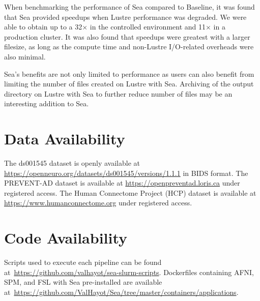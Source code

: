 \documentclass[pdflatex,sn-mathphys-num]{sn-jnl}
\theoremstyle{thmstyleone}%
\theoremstyle{thmstyletwo}%
\theoremstyle{thmstylethree}%
\begin{document}
    When benchmarking the performance of Sea compared to Baseline, it was found that Sea provided speedups
    when Lustre performance was degraded. We were able to obtain up to a
    32$\times$ in the controlled environment and 11$\times$ in a production
    cluster. It was also found that speedups were greatest with a larger
    filesize, as long as the compute time and non-Lustre I/O-related overheads
    were also minimal.

    Sea's benefits are not only limited to performance as
    users can also benefit from limiting the number of files created on Lustre
    with Sea. Archiving of the output directory on Lustre with Sea to further
    reduce number of files may be an interesting addition to Sea.
    
    
    
    
    
    
    
    
    
    

    \section*{Data Availability}

    The ds001545 dataset is openly available at \url{https://openneuro.org/datasets/ds001545/versions/1.1.1} in BIDS format.
    The PREVENT-AD dataset is available at \url{https://openpreventad.loris.ca} under registered access.
    The Human Connectome Project (HCP) dataset is available at \url{https://www.humanconnectome.org} under registered access.

    \section*{Code Availability}

    Scripts used to
    execute each pipeline can be found
    at~\url{https://github.com/valhayot/sea-slurm-scripts}. 
    Dockerfiles containing AFNI, SPM, and FSL with Sea pre-installed are available
    at~\url{https://github.com/ValHayot/Sea/tree/master/containers/applications}.
\end{document}
